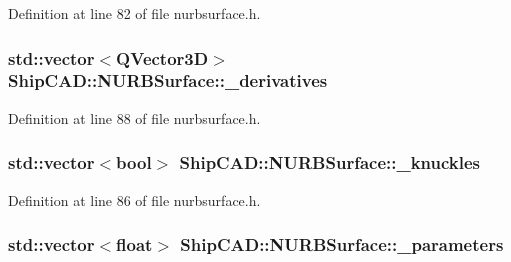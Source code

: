 Definition at line 82 of file nurbsurface.\-h.

\hypertarget{classShipCAD_1_1NURBSurface_a6fa7cce7b1c78fc8fc89be24cba4d9b0}{
\subsubsection[{\-\_\-derivatives}]{\setlength{\rightskip}{0pt plus 5cm}std\-::vector$<$Q\-Vector3\-D$>$ Ship\-C\-A\-D\-::\-N\-U\-R\-B\-Surface\-::\-\_\-derivatives\hspace{0.3cm}{\ttfamily [protected]}}}\label{classShipCAD_1_1NURBSurface_a6fa7cce7b1c78fc8fc89be24cba4d9b0}


Definition at line 88 of file nurbsurface.\-h.

\hypertarget{classShipCAD_1_1NURBSurface_a6f1765a2698b4ed79f0d110409129c28}{
\subsubsection[{\-\_\-knuckles}]{\setlength{\rightskip}{0pt plus 5cm}std\-::vector$<$bool$>$ Ship\-C\-A\-D\-::\-N\-U\-R\-B\-Surface\-::\-\_\-knuckles\hspace{0.3cm}{\ttfamily [protected]}}}\label{classShipCAD_1_1NURBSurface_a6f1765a2698b4ed79f0d110409129c28}


Definition at line 86 of file nurbsurface.\-h.

\hypertarget{classShipCAD_1_1NURBSurface_a6de7536d23d408368f2df4470c1514af}{
\subsubsection[{\-\_\-parameters}]{\setlength{\rightskip}{0pt plus 5cm}std\-::vector$<$float$>$ Ship\-C\-A\-D\-::\-N\-U\-R\-B\-Surface\-::\-\_\-parameters\hspace{0.3cm}{\ttfamily [protected]}}}\label{classShipCAD_1_1NURBSurface_a6de7536d23d408368f2df4470c1514af}


